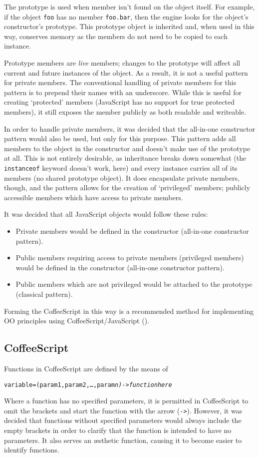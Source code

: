 The prototype is used when member isn't found on the object itself. For example, if the object \texttt{foo} has no member \texttt{foo.bar}, then the engine looks for the object's constructor's prototype. This prototype object is inherited and, when used in this way, conserves memory as the members do not need to be copied to each instance.

Prototype members are \emph{live} members; changes to the prototype will affect all current and future instances of the object. As a result, it is not a useful pattern for private members. The conventional handling of private members for this pattern is to prepend their names with an underscore. While this is useful for creating `protected' members (Java\-Script has no support for true protected members), it still exposes the member publicly as both readable and writeable.

In order to handle private members, it was decided that the all-in-one constructor pattern would also be used, but only for this purpose. This pattern adds all members to the object in the constructor and doesn't make use of the prototype at all. This is not entirely desirable, as inheritance breaks down somewhat (the \texttt{instanceof} keyword doesn't work, here) and every instance carries all of its members (no shared prototype object). It does encapsulate private members, though, and the pattern allows for the creation of `privileged' members; publicly accessible members which have access to private members.

It was decided that all Java\-Script objects would follow these rules:
\begin{itemize}
	\item Private members would be defined in the constructor (all-in-one constructor pattern).
	\item Public members requiring access to private members (privileged members) would be defined in the constructor (all-in-one constructor pattern).
	\item Public members which are not privileged would be attached to the prototype (classical pattern).
\end{itemize}

Forming the Coffee\-Script in this way is a recommended method for implementing OO principles using Coffee\-Script\slash Java\-Script (\cite{GridCoffeeOOP}).

\subsection{CoffeeScript}
Functions in Coffee\-Script are defined by the means of
\begin{alltt}variable = (param1, param2, \ldots, param\slshape{n}\upshape) -> function here\end{alltt}
Where a function has no specified parameters, it is permitted in Coffee\-Script to omit the brackets and start the function with the arrow (\texttt{->}). However, it was decided that functions without specified parameters would always include the empty brackets in order to clarify that the function is intended to have no parameters. It also serves an \ae{}sthetic function, causing it to become easier to identify functions.

